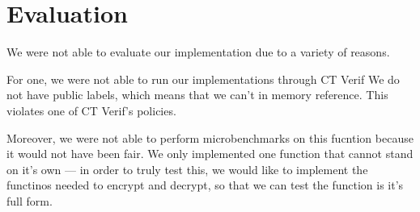 \section{Evaluation}
\label{sec:evaluation}
We were not able to evaluate our implementation due to a variety of reasons.

For one, we were not able to run our implementations through CT Verif\cite{almeida2016}
We do not have public labels, which means that we can't in memory
reference. This violates one of CT Verif's policies. 

Moreover, we were not able to perform microbenchmarks on this fucntion because
it would not have been fair. We only implemented one function that cannot stand
on it's own --- in order to truly test this, we would like to implement the
functinos needed to encrypt and decrypt, so that we can test the function is
it's full form.
